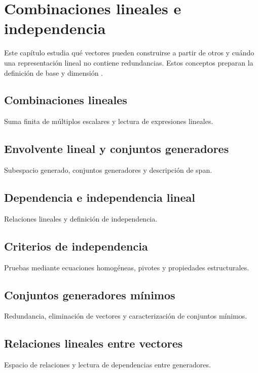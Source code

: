\chapter{Combinaciones lineales e independencia}
\label{cap:combinaciones-independencia}

Este capítulo estudia qué vectores pueden construirse a partir de otros y cuándo una representación lineal no contiene redundancias. Estos conceptos preparan la definición de base y dimensión \cite{lang1986,hoffmankunze1971}.

\section{Combinaciones lineales}
Suma finita de múltiplos escalares y lectura de expresiones lineales.

\section{Envolvente lineal y conjuntos generadores}
Subespacio generado, conjuntos generadores y descripción de span.

\section{Dependencia e independencia lineal}
Relaciones lineales y definición de independencia.

\section{Criterios de independencia}
Pruebas mediante ecuaciones homogéneas, pivotes y propiedades estructurales.

\section{Conjuntos generadores mínimos}
Redundancia, eliminación de vectores y caracterización de conjuntos mínimos.

\section{Relaciones lineales entre vectores}
Espacio de relaciones y lectura de dependencias entre generadores.
